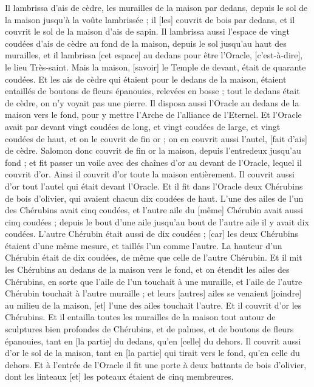 \begin{multicols}{2}
Il lambrissa d'ais de cèdre, les murailles de la maison par dedans, depuis le sol de la maison jusqu'à la voûte lambrissée ; il [les] couvrit de bois par dedans, et il couvrit le sol de la maison d'ais de sapin.
Il lambrissa aussi l'espace de vingt coudées d'ais de cèdre au fond de la maison, depuis le sol jusqu'au haut des murailles, et il lambrissa [cet espace] au dedans pour être l'Oracle, [c'est-à-dire], le lieu Très-saint.
Mais la maison, [savoir] le Temple de devant, était de quarante coudées.
Et les ais de cèdre qui étaient pour le dedans de la maison, étaient entaillés de boutons de fleurs épanouies, relevées en bosse ; tout le dedans était de cèdre, on n'y voyait pas une pierre.
Il disposa aussi l'Oracle au dedans de la maison vers le fond, pour y mettre l'Arche de l'alliance de l'Eternel.
Et l'Oracle avait par devant vingt coudées de long, et vingt coudées de large, et vingt coudées de haut, et on le couvrit de fin or ; on en couvrit aussi l'autel, [fait d'ais] de cèdre.
Salomon donc couvrit de fin or la maison, depuis l'entredeux jusqu'au fond ; et fit passer un voile avec des chaînes d'or au devant de l'Oracle, lequel il couvrit d'or.
Ainsi il couvrit d'or toute la maison entièrement. Il couvrit aussi d'or tout l'autel qui était devant l'Oracle.
Et il fit dans l'Oracle deux Chérubins de bois d'olivier, qui avaient chacun dix coudées de haut.
L'une des ailes de l'un des Chérubins avait cinq coudées, et l'autre aile du [même] Chérubin avait aussi cinq coudées ; depuis le bout d'une aile jusqu'au bout de l'autre aile il y avait dix coudées.
L'autre Chérubin était aussi de dix coudées ; [car] les deux Chérubins étaient d'une même mesure, et taillés l'un comme l'autre.
La hauteur d'un Chérubin était de dix coudées, de même que celle de l'autre Chérubin.
Et il mit les Chérubins au dedans de la maison vers le fond, et on étendit les ailes des Chérubins, en sorte que l'aile de l'un touchait à une muraille, et l'aile de l'autre Chérubin touchait à l'autre muraille ; et leurs [autres] ailes se venaient [joindre] au milieu de la maison, [et] l'une des ailes touchait l'autre.
Et il couvrit d'or les Chérubins.
Et il entailla toutes les murailles de la maison tout autour de sculptures bien profondes de Chérubins, et de palmes, et de boutons de fleurs épanouies, tant en [la partie] du dedans, qu'en [celle] du dehors.
Il couvrit aussi d'or le sol de la maison, tant en [la partie] qui tirait vers le fond, qu'en celle du dehors.
Et à l'entrée de l'Oracle il fit une porte à deux battants de bois d'olivier, dont les linteaux [et] les poteaux étaient de cinq membreures.

\end{multicols}
